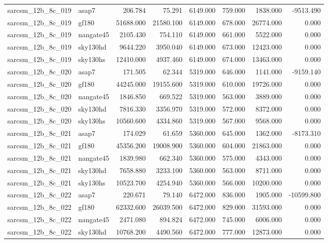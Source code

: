 \begin{tabular}{llrrrrrr}
sarcsm\_12b\_8c\_019 & asap7 & 206.784 & 75.291 & 6149.000 & 759.000 & 1838.000 & -9513.490 \\
sarcsm\_12b\_8c\_019 & gf180 & 51688.000 & 21580.100 & 6149.000 & 678.000 & 26774.000 & 0.000 \\
sarcsm\_12b\_8c\_019 & nangate45 & 2105.430 & 754.110 & 6149.000 & 661.000 & 5522.000 & 0.000 \\
sarcsm\_12b\_8c\_019 & sky130hd & 9644.220 & 3950.040 & 6149.000 & 673.000 & 12423.000 & 0.000 \\
sarcsm\_12b\_8c\_019 & sky130hs & 12410.000 & 4937.460 & 6149.000 & 674.000 & 13463.000 & 0.000 \\
sarcsm\_12b\_8c\_020 & asap7 & 171.505 & 62.344 & 5319.000 & 646.000 & 1141.000 & -9159.140 \\
sarcsm\_12b\_8c\_020 & gf180 & 44245.000 & 19155.600 & 5319.000 & 610.000 & 19726.000 & 0.000 \\
sarcsm\_12b\_8c\_020 & nangate45 & 1846.850 & 669.522 & 5319.000 & 563.000 & 3889.000 & 0.000 \\
sarcsm\_12b\_8c\_020 & sky130hd & 7816.330 & 3356.970 & 5319.000 & 572.000 & 8372.000 & 0.000 \\
sarcsm\_12b\_8c\_020 & sky130hs & 10560.600 & 4334.860 & 5319.000 & 567.000 & 9568.000 & 0.000 \\
sarcsm\_12b\_8c\_021 & asap7 & 174.029 & 61.659 & 5360.000 & 645.000 & 1362.000 & -8173.310 \\
sarcsm\_12b\_8c\_021 & gf180 & 45356.200 & 19008.900 & 5360.000 & 604.000 & 21863.000 & 0.000 \\
sarcsm\_12b\_8c\_021 & nangate45 & 1839.980 & 662.340 & 5360.000 & 575.000 & 4343.000 & 0.000 \\
sarcsm\_12b\_8c\_021 & sky130hd & 7658.880 & 3233.100 & 5360.000 & 563.000 & 8711.000 & 0.000 \\
sarcsm\_12b\_8c\_021 & sky130hs & 10523.700 & 4254.940 & 5360.000 & 566.000 & 10200.000 & 0.000 \\
sarcsm\_12b\_8c\_022 & asap7 & 220.671 & 79.140 & 6472.000 & 836.000 & 1905.000 & -10599.800 \\
sarcsm\_12b\_8c\_022 & gf180 & 62332.600 & 26039.500 & 6472.000 & 829.000 & 31593.000 & 0.000 \\
sarcsm\_12b\_8c\_022 & nangate45 & 2471.080 & 894.824 & 6472.000 & 745.000 & 6006.000 & 0.000 \\
sarcsm\_12b\_8c\_022 & sky130hd & 10768.200 & 4490.560 & 6472.000 & 777.000 & 12873.000 & 0.000 \\

\end{tabular}
